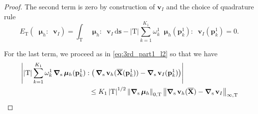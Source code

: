\documentclass[oneside]{amsart} %
\newcommand{\norm}[1]{\left\lVert#1\right\rVert}
\newcommand{\abs}[1]{\left\lvert#1\right\rvert}
\DeclareMathOperator{\grads}{\boldsymbol\nabla_s}
\renewcommand\v{\mathbf{v}} %
\newcommand\s{\mathbf{s}} %
\newcommand\X{\mathbf{X}} %
\newcommand\Xbar{\overline{\X}} %
\newcommand\mmu{{\boldsymbol\mu}} %
\newcommand\ds{\mathrm{d}\s} %
\newcommand\quadnode{\mathbf{p}}
\newcommand\quadweigth{\omega}
\newcommand\tri{\mathrm{T}} %
\begin{document}
\begin{proof}
		The second term is zero by construction of $\v_I$ and the choice of quadrature rule
		\begin{equation}
			E_\tri(\grads\mmu_h:\grads\v_I) = \int_\tri \grads\mmu_h:\grads\v_I\,\ds - \abs{\tri}\sum_{k=1}^{K_1}\quadweigth_k^1\grads\mmu_h(\quadnode_k^1):\grads\v_I(\quadnode_k^1)=0.
		\end{equation}
		
		For the last term, we proceed as in \eqref{eq:3rd_part1_l2} so that we have
		\begin{equation}\label{eq:3rd_part1_h1}
			\begin{aligned}
				&\abs{\abs{\tri} \sum_{k=1}^{K_1}\quadweigth_k^1 \grads\mmu_h(\quadnode_k^1): \big(\grads\v_h(\Xbar(\quadnode_k^1))-\grads\v_I(\quadnode_k^1)\big)}\\
				&\hspace{3.5cm}\le K_1 \abs{\tri}^{1/2} \norm{\grads\mmu_h}_{0,\tri}\norm{\grads\v_h(\Xbar)-\grads\v_I}_{\infty,\tri}%
			\end{aligned}
		\end{equation}
		

\end{proof}
\end{document}
